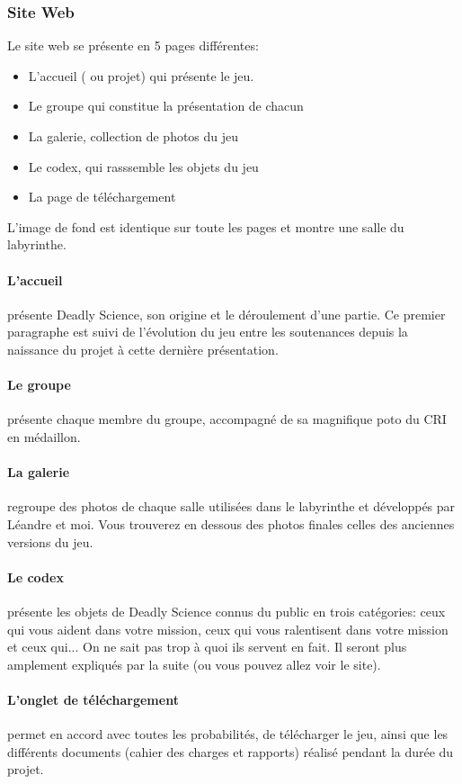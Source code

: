 \documentclass{article}
\begin{document}
\subsubsection{Site Web}
Le site web se présente en 5 pages différentes:
\begin{itemize}
	\item{} L'accueil ( ou projet) qui présente le jeu.
	\item{} Le groupe qui constitue la présentation de chacun
	\item{} La galerie, collection de photos du jeu
	\item{} Le codex, qui rasssemble les objets du jeu
	\item{} La page de téléchargement
\end{itemize}
L'image de fond est identique sur toute les pages et montre une salle du labyrinthe.

\paragraph{L'accueil}présente Deadly Science, son origine et le déroulement d'une partie. Ce premier paragraphe est suivi de l'évolution du jeu entre les soutenances depuis la naissance du projet à cette dernière présentation.

\paragraph{Le groupe}présente chaque membre du groupe, accompagné de sa magnifique poto du CRI en médaillon.

\paragraph{La galerie}regroupe des photos de chaque salle utilisées dans le labyrinthe et développés par Léandre et moi. Vous trouverez en dessous des photos finales celles des anciennes versions du jeu.

\paragraph{Le codex}présente les objets de Deadly Science connus du public en trois catégories: ceux qui vous aident dans votre mission, ceux qui vous ralentisent dans votre mission et ceux qui... On ne sait pas trop à quoi ils servent en fait. Il seront plus amplement expliqués par la suite (ou vous pouvez allez voir le site).

\paragraph{L'onglet de téléchargement}permet en accord avec toutes les probabilités, de télécharger le jeu, ainsi que les différents documents (cahier des charges et rapports) réalisé pendant la durée du projet.
\end{document}

